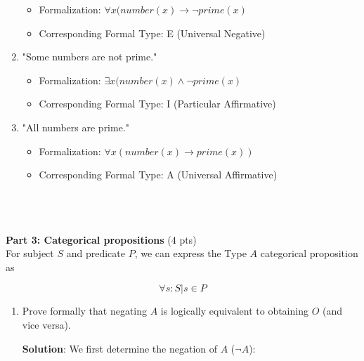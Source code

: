 \documentclass[12pt]{article}
\begin{document}
\begin{spacing}{1.5}
\begin{enumerate}
		      \begin{itemize}
		      	\item Formalization: $\forall x (number(x) \rightarrow \neg prime(x)$
		      	\item Corresponding Formal Type: E (Universal Negative)
		      \end{itemize}
		      		      		      		      		      		      		        
		\item "Some numbers are not prime."
		      		      		      		      		      		      		      
		      \begin{itemize}
		      	\item Formalization: $\exists x(number(x) \land \neg prime(x)$
		      	\item Corresponding Formal Type: I (Particular Affirmative)
		      \end{itemize}
		      		      		      		      		      		      		        
		\item "All numbers are prime."
		      		      		      		      		      		      		      
		      \begin{itemize}
		      	\item Formalization: $\forall x(number(x) \rightarrow prime(x))$
		      	\item Corresponding Formal Type: A (Universal Affirmative)\\ \\ \\ \\
		      \end{itemize}
		      		      		      		      		      		      		              
	\end{enumerate}
							
	\noindent \textbf{Part 3: Categorical propositions} (4 pts)\\
	For subject $S$ and predicate $P$, we can express the Type $A$ categorical proposition as
							
	$$\forall s : S | s \in P$$
							
	\begin{enumerate}
		\item Prove formally that negating $A$ is logically equivalent to obtaining $O$ (and vice versa).
		      		      		      		      		      		      		      
		      \textbf{Solution}: We first determine the negation of $A$ ($\neg A$):
		      		      		      		      		      		      		      

\end{enumerate}
\end{spacing}
\end{document}
